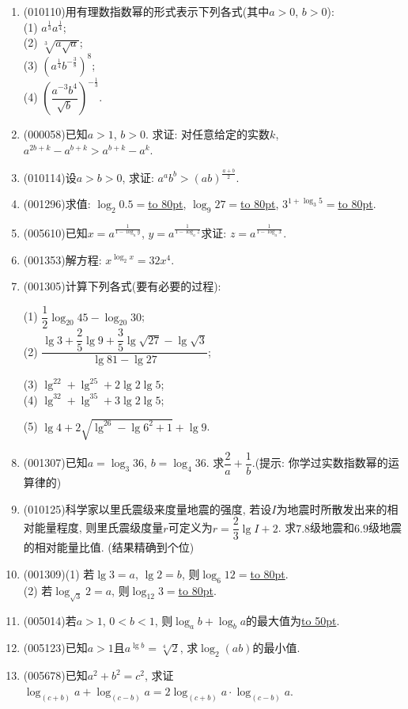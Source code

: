 \documentclass[10pt,a4paper]{article}
\newcommand{\blank}[1]{\underline{\hbox to #1pt{}}}
\begin{document}
\begin{enumerate}[1.]
\item {\tiny (010110)}用有理数指数幂的形式表示下列各式(其中$a>0$, $b>0$):\\
(1) $a^\frac 13a^\frac 14$;\\
(2) $\sqrt[3]{a\sqrt a}$;\\
(3) $(a^\frac 14b^{-\frac 38})^8$;\\
(4) $(\dfrac {a^{-3}b^4}{\sqrt b})^{-\frac 13}$.
\item {\tiny (000058)}已知$a>1$, $b>0$. 求证: 对任意给定的实数$k$, $a^{2b+k}-a^{b+k}>a^{b+k}-a^k$.
\item {\tiny (010114)}设$a>b>0$, 求证: $a^ab^b>(ab)^\frac{a+b}2$.
\item {\tiny (001296)}求值: $\log_2 0.5=$\blank{80}, $\log_9 27=$\blank{80}, $3^{1+\log_3 5}=$\blank{80}.
\item {\tiny (005610)}已知$x=a^{\frac 1{1-\log_ay}}$, $y=a^{\frac 1{1-\log_az}}$求证: $z=a^{\frac 1{1-\log_ax}}$.
\item {\tiny (001353)}解方程: $x^{\log_2 x}=32x^4$.
\item {\tiny (001305)}计算下列各式(要有必要的过程):
\begin{multicols}{2}
(1) $\dfrac{1}{2}\log_{20}45-\log_{20}30$;\\ 
(2) $\dfrac{\lg3+\dfrac{2}{5}\lg9+\dfrac{3}{5}\lg\sqrt{27}-\lg\sqrt{3}}{\lg81-\lg27}$;\\ 
\end{multicols}
\begin{multicols}{2}
(3) $\lg^22+\lg^25+2\lg2\lg5$; \\ 
(4) $\lg^32+\lg^35+3\lg2\lg5$;\hfill\\ 
\end{multicols}
\begin{multicols}{2}
(5) $\lg4+2\sqrt{\lg^26-\lg6^2+1}+\lg9$.\\ 
\end{multicols}
\item {\tiny (001307)}已知$a=\log_3 36$, $b=\log_4 36$. 求$\dfrac{2}{a}+\dfrac{1}{b}$.(提示: 你学过实数指数幂的运算律的)
\item {\tiny (010125)}科学家以里氏震级来度量地震的强度, 若设$I$为地震时所散发出来的相对能量程度, 则里氏震级度量$r$可定义为$r=\dfrac 23\lg I+2$. 求$7.8$级地震和$6. 9$级地震的相对能量比值. (结果精确到个位)
\item {\tiny (001309)}(1) 若$\lg 3=a$, $\lg 2=b$, 则$\log_6 12=$\blank{80}.\\ 
(2) 若$\log_{\sqrt{3}} 2=a$, 则$\log_{12} 3=$\blank{80}.
\item {\tiny (005014)}若$a>1$, $0<b<1$, 则$\log_ab+\log_ba$的最大值为\blank{50}.
\item {\tiny (005123)}已知$a>1$且$a^{\lg b}=\sqrt[4]2$, 求$\log_2(ab)$的最小值.
\item {\tiny (005678)}已知$a^2+b^2=c^2$, 求证$\log_{(c+b)}a+\log_{(c-b)}a=2\log_{(c+b)}a\cdot \log_{(c-b)}a$.
\end{enumerate}
\end{document}
